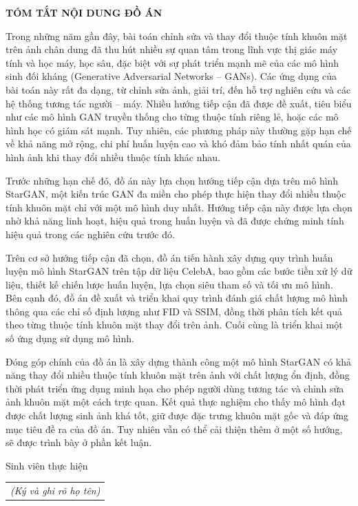 \documentclass[../DoAn.tex]{subfiles}
\begin{document}
\begin{center}
    \Large{\textbf{TÓM TẮT NỘI DUNG ĐỒ ÁN}}\\
\end{center}
\vspace{1cm}
Trong những năm gần đây, bài toán chỉnh sửa và thay đổi thuộc tính khuôn mặt trên ảnh chân dung đã thu hút nhiều sự quan tâm trong lĩnh vực thị giác máy tính và học máy, học sâu, đặc biệt với sự phát triển mạnh mẽ của các mô hình sinh đối kháng (Generative Adversarial Networks – GANs). Các ứng dụng của bài toán này rất đa dạng, từ chỉnh sửa ảnh, giải trí, đến hỗ trợ nghiên cứu và các hệ thống tương tác người – máy. Nhiều hướng tiếp cận đã được đề xuất, tiêu biểu như các mô hình GAN truyền thống cho từng thuộc tính riêng lẻ, hoặc các mô hình học có giám sát mạnh. Tuy nhiên, các phương pháp này thường gặp hạn chế về khả năng mở rộng, chi phí huấn luyện cao và khó đảm bảo tính nhất quán của hình ảnh khi thay đổi nhiều thuộc tính khác nhau.

Trước những hạn chế đó, đồ án này lựa chọn hướng tiếp cận dựa trên mô hình StarGAN, một kiến trúc GAN đa miền cho phép thực hiện thay đổi nhiều thuộc tính khuôn mặt chỉ với một mô hình duy nhất. Hướng tiếp cận này được lựa chọn nhờ khả năng linh hoạt, hiệu quả trong huấn luyện và đã được chứng minh tính hiệu quả trong các nghiên cứu trước đó.

Trên cơ sở hướng tiếp cận đã chọn, đồ án tiến hành xây dựng quy trình huấn luyện mô hình StarGAN trên tập dữ liệu CelebA, bao gồm các bước tiền xử lý dữ liệu, thiết kế chiến lược huấn luyện, lựa chọn siêu tham số và tối ưu mô hình. Bên cạnh đó, đồ án đề xuất và triển khai quy trình đánh giá chất lượng mô hình thông qua các chỉ số định lượng như FID và SSIM, đồng thời phân tích kết quả theo từng thuộc tính khuôn mặt thay đổi trên ảnh. Cuối cùng là triển khai một số ứng dụng sử dụng mô hình.

Đóng góp chính của đồ án là xây dựng thành công một mô hình StarGAN có khả năng thay đổi nhiều thuộc tính khuôn mặt trên ảnh với chất lượng ổn định, đồng thời phát triển ứng dụng minh họa cho phép người dùng tương tác và chỉnh sửa ảnh khuôn mặt một cách trực quan. Kết quả thực nghiệm cho thấy mô hình đạt được chất lượng sinh ảnh khá tốt, giữ được đặc trưng khuôn mặt gốc và đáp ứng mục tiêu đề ra của đồ án. Tuy nhiên vẫn có thể cải thiện thêm ở một số hướng, sẽ được trình bày ở phần kết luận.
\begin{flushright}
Sinh viên thực hiện\\
\begin{tabular}{@{}c@{}}
\textit{(Ký và ghi rõ họ tên)}
\end{tabular}
\end{flushright}
\end{document}
